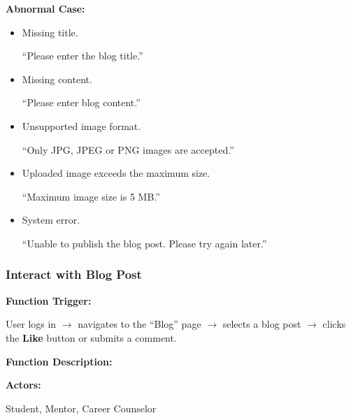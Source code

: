 \vspace{0.2cm}

\textbf{Abnormal Case:}

\begin{itemize}
    \item Missing title.

    ``Please enter the blog title.''

    \item Missing content.

    ``Please enter blog content.''

    \item Unsupported image format.

    ``Only JPG, JPEG or PNG images are accepted.''

    \item Uploaded image exceeds the maximum size.

    ``Maximum image size is 5 MB.''

    \item System error.

    ``Unable to publish the blog post. Please try again later.''
\end{itemize}


\subsubsection{Interact with Blog Post}

\textbf{Function Trigger:}

User logs in $\rightarrow$ navigates to the ``Blog'' page $\rightarrow$ selects a blog post $\rightarrow$ clicks the \textbf{Like} button or submits a comment.

\vspace{0.3cm}

\textbf{Function Description:}

\textbf{Actors:}

Student, Mentor, Career Counselor

\vspace{0.2cm}

